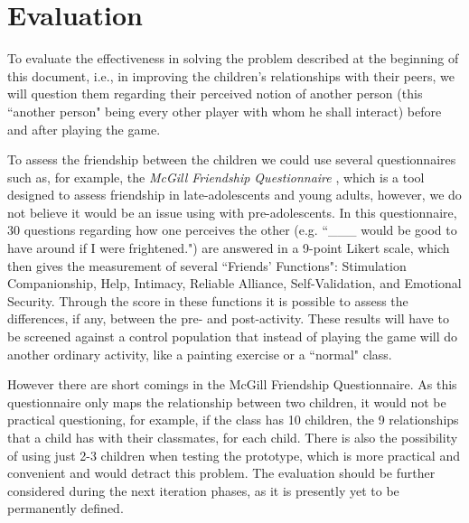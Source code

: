 \documentclass[runningheads]{llncs}
\begin{document}
\section{Evaluation}
\par To evaluate the effectiveness in solving the problem described at the beginning of this document, i.e., in improving the children's relationships with their peers, we will question them regarding their perceived notion of another person (this ``another person" being every other player with whom he shall interact) before and after playing the game. 
\par To assess the friendship between the children we could use several questionnaires such as, for example, the \textit{McGill Friendship Questionnaire} \cite{ref_article16}, which is a tool designed to assess friendship in late-adolescents and young adults, however, we do not believe it would be an issue using with pre-adolescents. In this questionnaire, 30 questions regarding how one perceives the other (e.g. ``\_\_\_ would be good to have around if I were frightened.") are answered in a 9-point Likert scale, which then gives the measurement of several ``Friends' Functions": Stimulation Companionship, Help, Intimacy, Reliable Alliance, Self-Validation, and Emotional Security. Through the score in these functions it is possible to assess the differences, if any, between the pre- and post-activity. These results will have to be screened against a control population that instead of playing the game will do another ordinary activity, like a painting exercise or a ``normal" class. 
\par However there are short comings in the McGill Friendship Questionnaire. As this questionnaire only maps the relationship between two children, it would not be practical questioning, for example, if the class has 10 children, the 9 relationships that a child has with their classmates, for each child. There is also the possibility of using just 2-3 children when testing the prototype, which is more practical and convenient and would detract this problem. The evaluation should be further considered during the next iteration phases, as it is presently yet to be permanently defined. 
\end{document}
